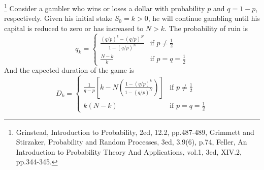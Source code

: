 \begin{lemma}
\footnote{Grinstead, Introduction to Probability, 2ed, 12.2, pp.487-489,
  Grimmett and Stirzaker, Probability and Random Processes, 3ed, 3.9(6), p.74,
  Feller, An Introduction to Probability Theory And Applications, vol.1, 3ed, 
  XIV.2, pp.344-345.}
Consider a gambler who wins or loses a dollar with probability $p$ and $q=1-p$,
respectively. Given his initial stake $S_0=k>0$, he will continue gambling 
until his capital is reduced to zero or has increased to $N>k$. The probability
of ruin is
\begin{equation}
  q_k= 
    \begin{cases}
      \frac{(q/p)^k - (q/p)^N}{1 - (q/p)^N}  &\text{if $p\neq \frac{1}{2}$} \\
      \frac{N-k}{k}                          &\text{if $p=q= \frac{1}{2}$} 
    \end{cases}
\end{equation}
And the expected duration of the game is
\begin{equation}
  D_k= 
    \begin{cases}
      \frac{1}{q-p} 
        \left[ k - N \left( \frac{1-(q/p)^k}{1-(q/p)^N} \right) \right]
                &\text{if $p\neq \frac{1}{2}$} \\
      k (N-k)   &\text{if $p=q= \frac{1}{2}$} 
    \end{cases}
\end{equation}
\end{lemma}
